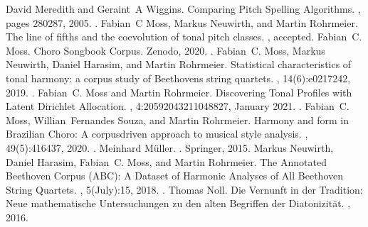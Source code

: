 \documentclass[letterpaper,10pt,english]{sphinxmanual}
\begin{document}
\begin{sphinxthebibliography}{10}
\sphinxAtStartPar
David Meredith and Geraint A Wiggins. Comparing Pitch Spelling Algorithms. , pages 280\textendash{}287, 2005. .
\sphinxAtStartPar
Fabian C Moss, Markus Neuwirth, and Martin Rohrmeier. The line of fifths and the co\sphinxhyphen{}evolution of tonal pitch classes. , accepted.
\sphinxAtStartPar
Fabian C. Moss. Choro Songbook Corpus. Zenodo, 2020. .
\sphinxAtStartPar
Fabian C. Moss, Markus Neuwirth, Daniel Harasim, and Martin Rohrmeier. Statistical characteristics of tonal harmony: a corpus study of Beethoven\textquotesingle{}s string quartets. , 14(6):e0217242, 2019. .
\sphinxAtStartPar
Fabian C. Moss and Martin Rohrmeier. Discovering Tonal Profiles with Latent Dirichlet Allocation. , 4:20592043211048827, January 2021. .
\sphinxAtStartPar
Fabian C. Moss, Willian Fernandes Souza, and Martin Rohrmeier. Harmony and form in Brazilian Choro: A corpus\sphinxhyphen{}driven approach to musical style analysis. , 49(5):416\textendash{}437, 2020. .
\sphinxAtStartPar
Meinhard Müller. . Springer, 2015.
\sphinxAtStartPar
Markus Neuwirth, Daniel Harasim, Fabian C. Moss, and Martin Rohrmeier. The Annotated Beethoven Corpus (ABC): A Dataset of Harmonic Analyses of All Beethoven String Quartets. , 5(July):1\textendash{}5, 2018. .
\sphinxAtStartPar
Thomas Noll. Die Vernunft in der Tradition: Neue mathematische Untersuchungen zu den alten Begriffen der Diatonizität. , 2016.

\end{sphinxthebibliography}
\end{document}
